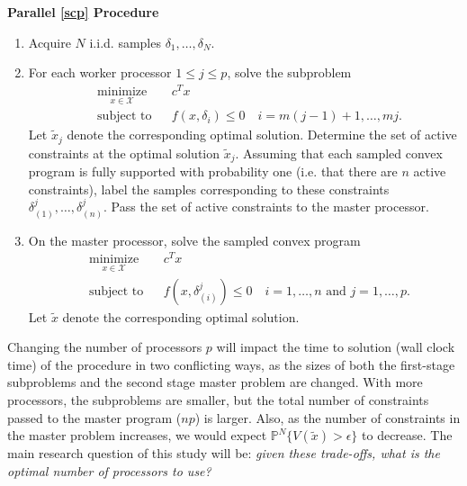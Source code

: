 \documentclass[12pt]{article}
\begin{document}
\bigskip
\textbf{Parallel \ref{scp} Procedure}
\begin{enumerate}
\item Acquire $N$ i.i.d. samples $\delta_1, \ldots, \delta_N$.

\item For each worker processor $1 \leq j \leq p$, solve the subproblem
\begin{equation*}
\begin{aligned}
    & \underset{x \in \mathcal{X}}{\text{minimize}}
    & & c^T x \\
    & \text{subject to}
    & & f(x,\delta_i) \leq 0 \quad i = m(j-1) + 1, \ldots, mj.
\end{aligned}
\end{equation*}
Let $\tilde{x}_j$ denote the corresponding optimal solution.
Determine the set of active constraints at the optimal solution $\tilde{x}_j$.
Assuming that each sampled convex program is fully supported with probability one (i.e. that there are $n$ active constraints),
label the samples corresponding to these constraints $\delta_{(1)}^j, \ldots, \delta_{(n)}^j$.
Pass the set of active constraints to the master processor.

\item On the master processor, solve the sampled convex program
\begin{equation*}
\begin{aligned}
    & \underset{x \in \mathcal{X}}{\text{minimize}}
    & & c^T x \\
    & \text{subject to}
    & & f(x,\delta_{(i)}^j) \leq 0 \quad i = 1,\ldots,n \text{ and } j = 1,\ldots,p.
\end{aligned}
\end{equation*}
Let $\tilde{x}$ denote the corresponding optimal solution.
\end{enumerate}

Changing the number of processors $p$ will impact the time to solution (wall clock time) of the procedure in two conflicting ways, as the sizes of both the first-stage subproblems and the second stage master problem are changed. With more processors, the subproblems are smaller, but the total number of constraints passed to the master program ($np$) is larger.
Also, as the number of constraints in the master problem increases, we would expect $\mathbb{P}^N\{V(\tilde{x}) > \epsilon\}$ to decrease.
The main research question of this study will be: \textit{given these trade-offs, what is the optimal number of processors to use?}
\end{document}
